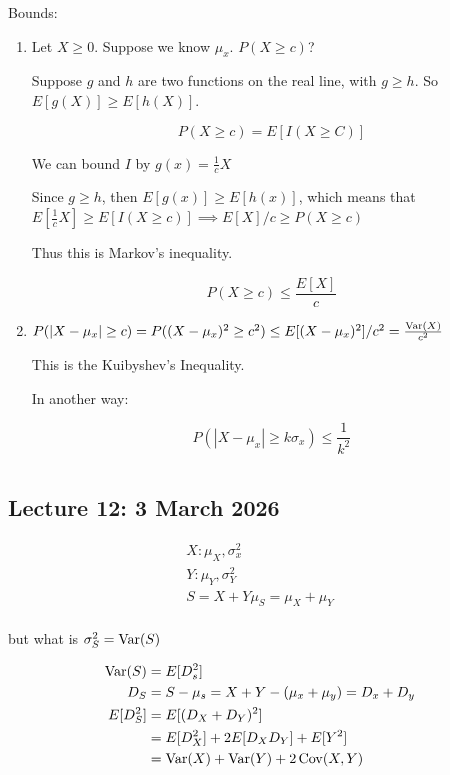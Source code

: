 \documentclass{report}
\begin{document}
Bounds: 
\begin{enumerate}
	\item Let $ X \ge 0 $. Suppose we know $ \mu _{x} $. $ P(X \ge c) $? 

		Suppose $ g $ and $ h $ are two functions on the real line, with $ g\ge h $. So $ E[g(X)] \ge E[h(X)] $. 

		\[
			P(X \ge c) = E[I(X\ge C)]
		\]

		We can bound $ I $ by $ g(x) = \frac{1}{c}X $ 

		Since $ g\ge h $, then $ E[g(x)] \ge E[h(x)] $, which means that $ E[\frac{1}{c} X ] \ge E[I(X\ge c)] \implies  E[X]/c \ge P(X\ge c)$ 

		Thus this is Markov's inequality. 

		\[
		P(X \ge c) \le \frac{E[X]}{c}
		\]

	\item $ P(|X-\mu _{x}| \ge c) = P((X-\mu _{x})^{2} \ge c^{2}) \le E[(X-\mu _{x})^{2}]/c^{2} = \frac{\operatorname{Var}(X)}{c^{2}}$ 

		This is the Kuibyshev's Inequality. 

		In another way: 

		\[
		P(|X-\mu _{x}| \ge k\sigma_{x}) \le \frac{1}{k^{2}}
		\]

\end{enumerate}

\chapter{}
\section{Lecture 12: 3 March 2026} 

\begin{align*}
	X: \mu _{X}, \sigma^{2}_{x} \\
	Y: \mu _{Y}, \sigma^{2}_{Y}\\
	S = X+Y
	\mu _{S} = \mu _{X} + \mu _{Y} \\
\end{align*}

but what is $ \sigma^{2}_{S} = \operatorname{Var}(S) $ 

\begin{align*}
\operatorname{Var}(S) &= E[D_{s}^{2}] \\
D_{S} &= S - \mu _{s} = X + Y - (\mu _{x} + \mu _{y}) = D_{x} + D_{y} \\
E[D_{S}^{2}] &= E[(D_{X}+D_{Y})^{2}] \\
&= E[D_{X}^{2}] + 2E[D_{X}D_{Y}] + E[Y^{2}] \\
&= \operatorname{Var}(X) + \operatorname{Var}(Y) + 2\operatorname{Cov}(X,Y) \\
\end{align*}
\end{document}
